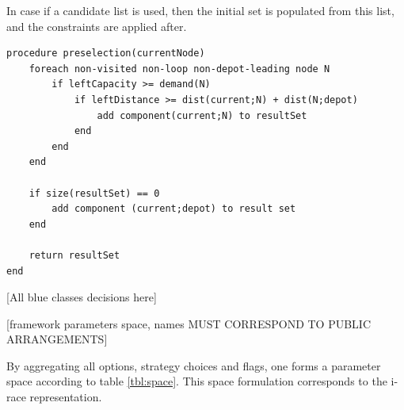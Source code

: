 \documentclass[11pt,a4paper,oneside]{book}
\begin{document}
In case if a candidate list is used, then the initial set is populated from this list, and the constraints are applied after.

\begin{minipage}[c, breaklines=true]{0.95\textwidth}
\begin{lstlisting}[caption={Solution component preselection pseudo-code}, label={lst:preselection}]
procedure preselection(currentNode)
	foreach non-visited non-loop non-depot-leading node N
		if leftCapacity >= demand(N)
			if leftDistance >= dist(current;N) + dist(N;depot)
				add component(current;N) to resultSet
			end
		end
	end
	
	if size(resultSet) == 0
		add component (current;depot) to result set
	end
		
	return resultSet
end
\end{lstlisting}
\end{minipage}


[All blue classes decisions here] \newline


[framework parameters space, names MUST CORRESPOND TO PUBLIC ARRANGEMENTS] \newline

By aggregating all options, strategy choices and flags, one forms a parameter space according to table \ref{tbl:space}. This space formulation corresponds to the i-race representation.
\end{document}

